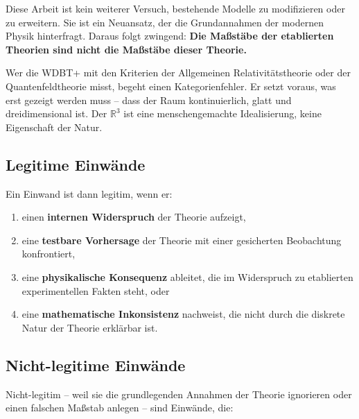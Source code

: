 Diese Arbeit ist kein weiterer Versuch, bestehende Modelle zu modifizieren oder zu erweitern. Sie ist ein Neuansatz, der die Grundannahmen der modernen Physik hinterfragt. Daraus folgt zwingend: \textbf{Die Maßstäbe der etablierten Theorien sind nicht die Maßstäbe dieser Theorie.}

Wer die WDBT+ mit den Kriterien der Allgemeinen Relativitätstheorie oder der Quantenfeldtheorie misst, begeht einen Kategorienfehler. Er setzt voraus, was erst gezeigt werden muss – dass der Raum kontinuierlich, glatt und dreidimensional ist. Der $\mathbb{R}^3$ ist eine menschengemachte Idealisierung, keine Eigenschaft der Natur.

\subsection{Legitime Einwände}
\label{sub:legitime_einwaende}

Ein Einwand ist dann legitim, wenn er:

\begin{enumerate}
    \item einen \textbf{internen Widerspruch} der Theorie aufzeigt,
    \item eine \textbf{testbare Vorhersage} der Theorie mit einer gesicherten Beobachtung konfrontiert,
    \item eine \textbf{physikalische Konsequenz} ableitet, die im Widerspruch zu etablierten experimentellen Fakten steht, oder
    \item eine \textbf{mathematische Inkonsistenz} nachweist, die nicht durch die diskrete Natur der Theorie erklärbar ist.
\end{enumerate}

\subsection{Nicht-legitime Einwände}
\label{sub:nicht_legitime_einwaende}

Nicht-legitim – weil sie die grundlegenden Annahmen der Theorie ignorieren oder einen falschen Maßstab anlegen – sind Einwände, die:

